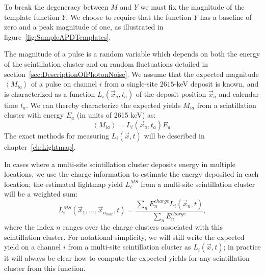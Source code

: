 To break the degeneracy between $M$ and $Y$ we must fix the magnitude of the template function $Y$.  We choose to require that the function $Y$ has a baseline of zero and a peak magnitude of one, as illustrated in figure~\ref{fig:SampleAPDTemplates}.

The magnitude of a pulse is a random variable which depends on both the energy of the scintillation cluster and on random fluctuations detailed in section~\ref{sec:DescriptionOfPhotonNoise}.  We assume that the expected magnitude $\left<M_{ia}\right>$ of a pulse on channel $i$ from a single-site $2615$-keV deposit is known, and is characterized as a function $L_i(\vec{x}_a, t_a)$ of the deposit position $\vec{x}_a$ and calendar time $t_a$.  We can thereby characterize the expected yields $M_{ia}$ from a scintillation cluster with energy $E_a$ (in units of 2615 keV) as:
\begin{equation}\label{eqn:DefineLByEandM}
\left< M_{ia} \right> = L_i(\vec{x}_a, t_a) E_a.
\end{equation}
The exact methods for measuring $L_i(\vec{x}, t)$ will be described in chapter~\ref{ch:Lightmap}.

In cases where a multi-site scintillation cluster deposits energy in multiple locations, we use the charge information to estimate the energy deposited in each location; the estimated lightmap yield $L_i^{MS}$ from a multi-site scintillation cluster will be a weighted sum:
\begin{equation}\label{eqn:LightMapMultisite}
L_i^{MS}(\vec{x}_1, \dots, \vec{x}_{n_{max}}, t) = \frac{\sum_n E_n^{charge} L_i(\vec{x}_n, t)}{\sum_n E_n^{charge}},
\end{equation}
where the index $n$ ranges over the charge clusters associated with this scintillation cluster.  For notational simplicity, we will still write the expected yield on a channel $i$ from a multi-site scintillation cluster as $L_i(\vec{x}, t)$; in practice it will always be clear how to compute the expected yields for any scintillation cluster from this function.

